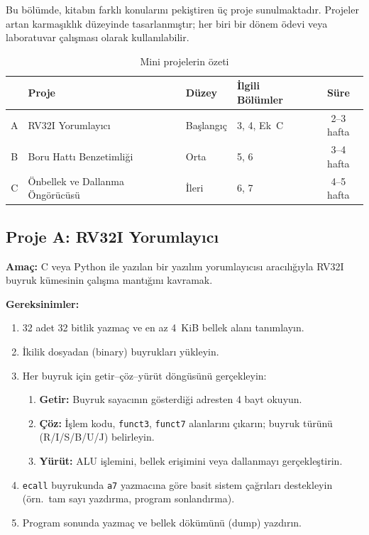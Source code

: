 Bu bölümde, kitabın farklı konularını pekiştiren üç proje sunulmaktadır. Projeler artan karmaşıklık düzeyinde tasarlanmıştır; her biri bir dönem ödevi veya laboratuvar çalışması olarak kullanılabilir.

\begin{table}[H]
\centering
\caption[Mini proje özet tablosu]{Mini projelerin özeti}
\label{tab:ekd-projeler}
\begin{tabular}{@{}clllc@{}}
\toprule
 & \textbf{Proje} & \textbf{Düzey} & \textbf{İlgili Bölümler} & \textbf{Süre} \\
\midrule
A & RV32I Yorumlayıcı          & Başlangıç & 3, 4, Ek~C     & 2--3 hafta \\
B & Boru Hattı Benzetimliği     & Orta      & 5, 6           & 3--4 hafta \\
C & Önbellek ve Dallanma Öngörücüsü & İleri & 6, 7      & 4--5 hafta \\
\bottomrule
\end{tabular}
\end{table}


\subsection{Proje A: RV32I Yorumlayıcı}
\label{sec:ekd-proje-a}

\textbf{Amaç:} C veya Python ile yazılan bir yazılım yorumlayıcısı aracılığıyla RV32I buyruk kümesinin çalışma mantığını kavramak.\smallskip

\textbf{Gereksinimler:}
\begin{enumerate}[leftmargin=2em]
    \item 32 adet 32 bitlik yazmaç ve en az 4~KiB bellek alanı tanımlayın.
    \item İkilik dosyadan (binary) buyrukları yükleyin.
    \item Her buyruk için getir--çöz--yürüt döngüsünü gerçekleyin:
    \begin{enumerate}[label=\alph*)]
        \item \textbf{Getir:} Buyruk sayacının gösterdiği adresten 4 bayt okuyun.
        \item \textbf{Çöz:} İşlem kodu, \texttt{funct3}, \texttt{funct7} alanlarını çıkarın; buyruk türünü (R/I/S/B/U/J) belirleyin.
        \item \textbf{Yürüt:} ALU işlemini, bellek erişimini veya dallanmayı gerçekleştirin.
    \end{enumerate}
    \item \texttt{ecall} buyrukunda \texttt{a7} yazmacına göre basit sistem çağrıları destekleyin (örn.\ tam sayı yazdırma, program sonlandırma).
    \item Program sonunda yazmaç ve bellek dökümünü (dump) yazdırın.
\end{enumerate}

